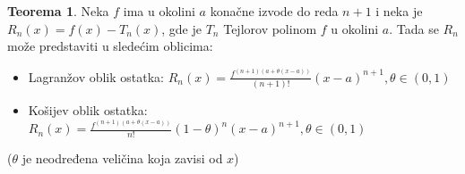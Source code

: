 \documentclass{article}
\theoremstyle{definition}
\newtheorem{theorem}{Teorema}[section]
\begin{document}
        \begin{theorem}
            Neka $f$ ima u okolini $a$ konačne izvode do reda $n + 1$ i neka je $R_n(x) = f(x) - T_n(x)$, gde je $T_n$ Tejlorov polinom $f$ u okolini $a$. Tada se $R_n$ može predstaviti u sledećim oblicima:
            \begin{itemize}
                \item Lagranžov oblik ostatka: $R_n(x) = \frac{f^{(n+1)(a + \theta(x-a))}}{(n+1)!}(x-a)^{n+1}, \theta \in (0, 1)$
                \item Košijev oblik ostatka: $R_n(x) = \frac{f^{(n+1)(a + \theta(x-a))}}{n!} (1-\theta)^n (x-a)^{n+1}, \theta \in (0, 1)$
            \end{itemize}
            ($\theta$ je neodređena veličina koja zavisi od $x$)
        \end{theorem}
\end{document}
